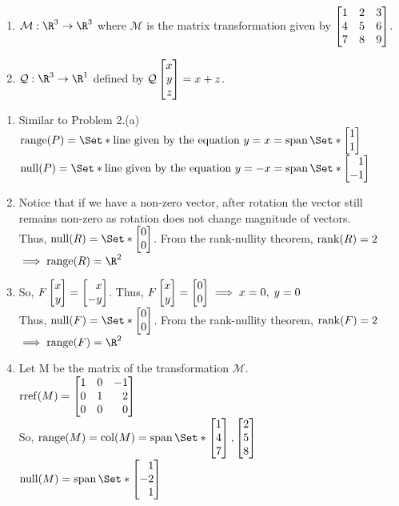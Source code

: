 \begin{exercises}
\begin{problist}
\begin{enumerate}
			\item $\mathcal M:\R^3\to\R^3$ where $\mathcal M$ is the matrix
				transformation given by $\mat{1&2&3\\4&5&6\\7&8&9}$.
			\item $\mathcal Q:\R^3\to\R^1$ defined by $\mathcal Q\mat{x\\y\\z}=x+z$.
		\end{enumerate}

		\begin{solution}
		    \begin{enumerate}
    		    \item Similar to Problem 2.(a)\\
    		    $\Range(P) = \Set*{\text{line given by the equation } y=x} = \Span\Set*{\mat{1\\1}}$\\
    		    $\Null(P) = \Set*{\text{line given by the equation } y=-x} = \Span\Set*{\mat{1\\-1}}$
    		    
    		    \item Notice that if we have a non-zero vector, after rotation the vector still remains non-zero as rotation does not change magnitude of vectors.\\
    		    Thus, $\Null(R)=\Set*{\mat{0\\0}}$. From the rank-nullity theorem, $\operatorname{rank}(R) = 2$\\
    		    $\implies \Range(R) = \R^2$
    		    
    		    \item So, $F\mat{x\\y} = \mat{x\\-y}$. Thus, $F\mat{x\\y} = \mat{0\\0} \implies x=0, \; y=0$\\
    		    Thus, $\Null(F)=\Set*{\mat{0\\0}}$. From the rank-nullity theorem, $\operatorname{rank}(F) = 2$\\
    		    $\implies \Range(F) = \R^2$
    		    
    		    \item Let M be the matrix of the transformation $\mathcal{M}$. \\
    		    $\Rref(M)= \mat{1&0&-1\\0&1&2\\0&0&0}$\\
    		    So, $\Range(M)=\Col(M)=\Span\Set*{\mat{1\\4\\7},\mat{2\\5\\8}}$\\
    		    $\Null(M)=\Span\Set*{\mat{1\\-2\\1}}$
    		    

\end{enumerate}
\end{solution}
\end{problist}
\end{exercises}
